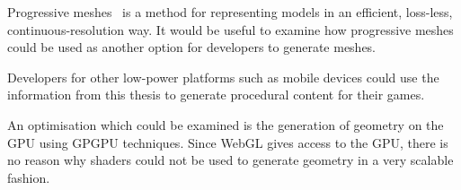 Progressive meshes~\cite{hoppe1996progressive} is a method for representing models in an efficient, loss-less, continuous-resolution way.
It would be useful to examine how progressive meshes could be used as another option for developers to generate meshes.

Developers for other low-power platforms such as mobile devices could use the information from this thesis to generate procedural content for their games.

An optimisation which could be examined is the generation of geometry on the GPU using GPGPU techniques.
Since WebGL gives access to the GPU, there is no reason why shaders could not be used to generate geometry in a very scalable fashion.

